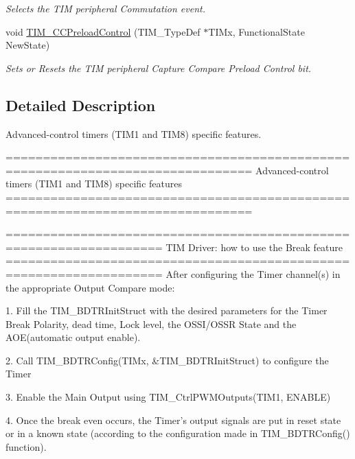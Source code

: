 \begin{DoxyCompactItemize}
\begin{DoxyCompactList}\small\item\em Selects the T\-I\-M peripheral Commutation event. \end{DoxyCompactList}\item 
void \hyperlink{group___t_i_m___group4_ga0a935254e44312b1d78e8684a58db3c1}{T\-I\-M\-\_\-\-C\-C\-Preload\-Control} (T\-I\-M\-\_\-\-Type\-Def $\ast$T\-I\-Mx, Functional\-State New\-State)
\begin{DoxyCompactList}\small\item\em Sets or Resets the T\-I\-M peripheral Capture Compare Preload Control bit. \end{DoxyCompactList}\end{DoxyCompactItemize}


\subsection{Detailed Description}
Advanced-\/control timers (T\-I\-M1 and T\-I\-M8) specific features. \begin{DoxyVerb} ===============================================================================
          Advanced-control timers (TIM1 and TIM8) specific features
 ===============================================================================  
  
       ===================================================================      
              TIM Driver: how to use the Break feature
       =================================================================== 
       After configuring the Timer channel(s) in the appropriate Output Compare mode: 
                         
       1. Fill the TIM_BDTRInitStruct with the desired parameters for the Timer
          Break Polarity, dead time, Lock level, the OSSI/OSSR State and the 
          AOE(automatic output enable).
               
       2. Call TIM_BDTRConfig(TIMx, &TIM_BDTRInitStruct) to configure the Timer
          
       3. Enable the Main Output using TIM_CtrlPWMOutputs(TIM1, ENABLE) 
          
       4. Once the break even occurs, the Timer's output signals are put in reset
          state or in a known state (according to the configuration made in
          TIM_BDTRConfig() function).\end{DoxyVerb}
 

